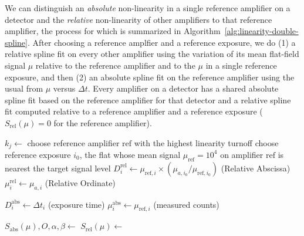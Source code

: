 We can distinguish an \emph{absolute} non-linearity in a single reference amplifier on a detector and the \emph{relative} non-linearity of other amplifiers to that reference amplifier, the process for which is summarized in Algorithm~\ref{alg:linearity-double-spline}.
After choosing a reference amplfier and a reference exposure, we do (1) a relative spline fit on every other amplifier using  the variation of its mean flat-field signal $\mu$ relative to the reference amplifier and to the $\mu$ in a single reference exposure, and then (2)
an absolute spline fit on the reference amplifier using the usual from $\mu$ versus $\Delta t$.
Every amplifier on a detector has a shared absolute spline fit based on the reference amplifier for that detector and a relative spline fit computed relative to a reference amplifier and a reference exposure ($S_{\mathrm{rel}}(\mu) = 0$ for the reference amplifier).

\begin{algorithm}[H]
\caption{Double-spline linearity fit (single detector)}
\label{alg:linearity-double-spline}
\begin{algorithmic}[1]
    \State $k_j \leftarrow$ 
    \State {}
\EndFor
\State choose reference amplifier $\mathrm{ref}$ with the highest linearity turnoff
\State choose reference exposure $i_0$, the flat whose mean signal $\mu_{\mathrm{ref}} = 10^4$ on amplifier $\mathrm{ref}$ is nearest the target signal level
        \State $D^{\mathrm{rel}}_{i} \leftarrow \mu_{\mathrm{ref}, i} \times (\mu_{a,i_0} / \mu_{\mathrm{ref}, i_0})$  (Relative Abscissa) %
        \State $\mu^{\mathrm{rel}}_{i} \leftarrow \mu_{a,i}$ (Relative Ordinate)
    \EndFor

    \State $D^{\mathrm{abs}}_{i} \leftarrow \Delta t_i$ (exposure time)
    \State $\mu^{\mathrm{abs}}_{i} \leftarrow \mu_{\mathrm{ref},i}$ (measured counts)
\EndFor

\Statex {}
\State $S_{\mathrm{abs}}(\mu), O, \alpha, \beta \leftarrow$ 
\State $S_{\mathrm{rel}}(\mu) \leftarrow$ 
\end{algorithmic}
\end{algorithm}

